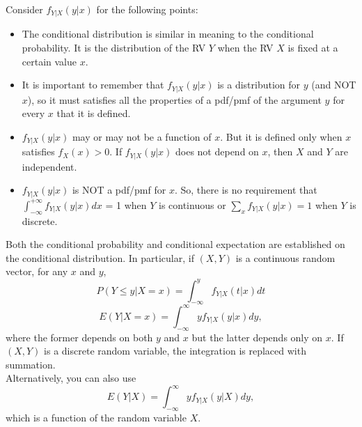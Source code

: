 \begin{note}
\end{note}
Consider $f_{Y|X}(y|x)$ for the following points:
\begin{itemize}
    \item The conditional distribution is similar in meaning to the conditional probability. It is the distribution of the RV $Y$ when the RV $X$ is fixed at a certain value $x$.
    \item It is important to remember that $f_{Y|X}(y|x)$ is a distribution for $y$ (and NOT $x$), so it must satisfies all the properties of a pdf/pmf of the argument $y$ for every $x$ that it is defined.
    \item $f_{Y|X}(y|x)$ may or may not be a function of $x$. But it is defined only when $x$ satisfies $f_X(x) > 0$. If $f_{Y|X}(y|x)$ does not depend on $x$, then $X$ and $Y$ are independent.
    \item $f_{Y|X}(y|x)$ is NOT a pdf/pmf for $x$. So, there is no requirement that $\int_{-\infty}^{+\infty} f_{Y|X}(y|x)dx$ = 1 when $Y$ is continuous or $\sum_{x} f_{Y|X}(y|x) = 1$ when $Y$ is discrete.
\end{itemize}

\begin{note}
\end{note}
Both the conditional probability and conditional expectation are established on the conditional distribution. In particular, if $(X,Y)$ is a continuous random vector, for any $x$ and $y$,
$$
P(Y \leq y | X = x) = \int_{-\infty}^{y} f_{Y|X} (t|x) dt
$$
$$
E(Y|X = x) = \int_{-\infty}^{\infty} y f_{Y|X} (y|x) dy,
$$
where the former depends on both $y$ and $x$ but the latter depends only on $x$. If $(X,Y)$ is a discrete random variable, the integration is replaced with summation. \\
Alternatively, you can also use
$$
E(Y|X)  = \int_{-\infty}^{\infty} y f_{Y|X} (y|X) dy,
$$
which is a function of the random variable $X$.

